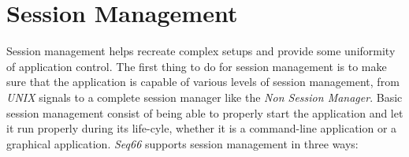 %
%
%

\section{Session Management}
\label{sec:sessions}

   Session management helps recreate complex setups and provide some uniformity
   of application control.
   The first thing to do for session management is to make sure that the
   application is capable of various levels of session management, from
   \textsl{UNIX} signals to
   a complete session manager like the \textsl{Non Session Manager}.
   Basic session management consist of being able to properly start the
   application and let it run properly during its life-cyle, whether it is a
   command-line application or a graphical application.
   \textsl{Seq66} supports session management in three ways:

